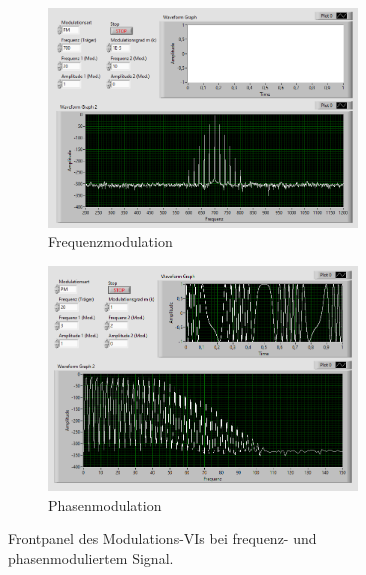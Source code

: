 \newpage
\pagestyle{empty}
\begin{figure}[H]
	\centering
	\begin{subfigure}[c]{\textwidth}
		\centering
		\includegraphics[width=0.9\textwidth]{pic/fm_example.png}
		\caption{Frequenzmodulation}
		\label{fig:fm_example}	
	\end{subfigure}
	\vspace{0.5cm}
	\begin{subfigure}[c]{\textwidth}
		\centering
		\includegraphics[width=0.9\textwidth]{pic/pm_example.png}
		\caption{Phasenmodulation}
		\label{fig:pm_example}	
	\end{subfigure}
	\caption{Frontpanel des Modulations-VIs bei frequenz- und phasenmoduliertem Signal.}
\end{figure} 

